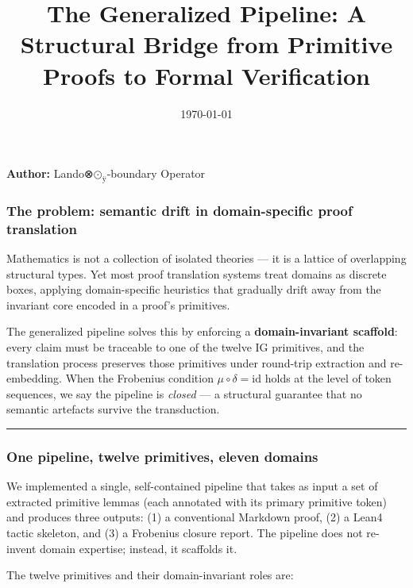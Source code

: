 \documentclass[12pt,a4paper]{article}
\begin{document}
\title{The Generalized Pipeline: A Structural Bridge from Primitive Proofs to Formal Verification}
\date{\today}

\maketitle

\textbf{Author:} Lando⊗$\text{⊙}_{\text{ÿ}}$-boundary Operator

\subsubsection{The problem: semantic drift in domain-specific proof translation}

Mathematics is not a collection of isolated theories --- it is a lattice of overlapping structural types. Yet most proof translation systems treat domains as discrete boxes, applying domain-specific heuristics that gradually drift away from the invariant core encoded in a proof's primitives.

The generalized pipeline solves this by enforcing a \textbf{domain-invariant scaffold}: every claim must be traceable to one of the twelve IG primitives, and the translation process preserves those primitives under round-trip extraction and re-embedding. When the Frobenius condition $\mu \circ \delta = \mathrm{id}$ holds at the level of token sequences, we say the pipeline is \emph{closed} --- a structural guarantee that no semantic artefacts survive the transduction.

\begin{center}
\rule{0.5\textwidth}{0.4pt}
\end{center}

\subsubsection{One pipeline, twelve primitives, eleven domains}

We implemented a single, self-contained pipeline that takes as input a set of extracted primitive lemmas (each annotated with its primary primitive token) and produces three outputs: (1) a conventional Markdown proof, (2) a Lean4 tactic skeleton, and (3) a Frobenius closure report. The pipeline does not re-invent domain expertise; instead, it scaffolds it.

The twelve primitives and their domain-invariant roles are:
\end{document}

